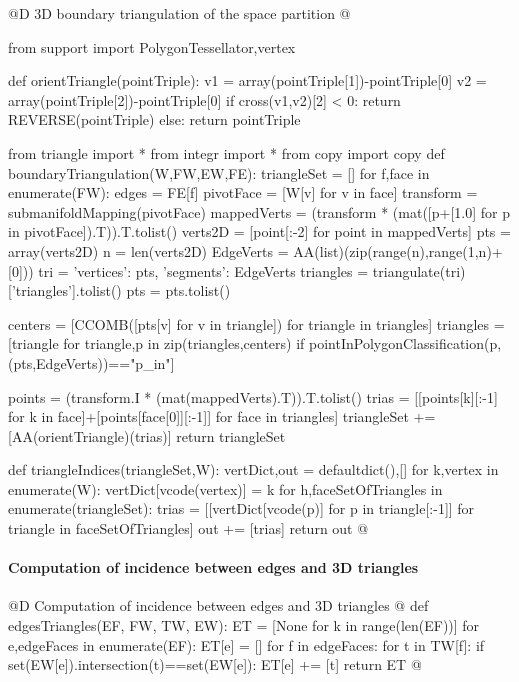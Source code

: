\documentclass[11pt,oneside]{article}    %
\begin{document}
@D 3D boundary triangulation of the space partition 
@{from support import PolygonTessellator,vertex

def orientTriangle(pointTriple):
    v1 = array(pointTriple[1])-pointTriple[0]
    v2 = array(pointTriple[2])-pointTriple[0]
    if cross(v1,v2)[2] < 0: return REVERSE(pointTriple)
    else: return pointTriple
    
from triangle import *
from integr import *
from copy import copy
def boundaryTriangulation(W,FW,EW,FE):
    triangleSet = []    
    for f,face in enumerate(FW):
        edges = FE[f]
        pivotFace = [W[v] for v in face]
        transform = submanifoldMapping(pivotFace)
        mappedVerts = (transform * (mat([p+[1.0] for p in pivotFace]).T)).T.tolist()
        verts2D = [point[:-2] for point in mappedVerts]  
        pts = array(verts2D)
        n = len(verts2D)
        EdgeVerts = AA(list)(zip(range(n),range(1,n)+[0]))
        tri = {    'vertices': pts, 'segments': EdgeVerts }
        triangles = triangulate(tri)['triangles'].tolist()
        pts = pts.tolist()
        
        centers = [CCOMB([pts[v] for v in triangle]) for triangle in triangles]
        triangles = [triangle for triangle,p in zip(triangles,centers) 
        	if pointInPolygonClassification(p,(pts,EdgeVerts))=="p_in"]	

        points = (transform.I * (mat(mappedVerts).T)).T.tolist()
        trias = [[points[k][:-1] for k in face]+[points[face[0]][:-1]] for face in triangles]
        triangleSet += [AA(orientTriangle)(trias)]
    return triangleSet

def triangleIndices(triangleSet,W):
    vertDict,out = defaultdict(),[]
    for k,vertex in enumerate(W):  vertDict[vcode(vertex)] = k
    for h,faceSetOfTriangles in enumerate(triangleSet):
        trias = [[vertDict[vcode(p)] for p in triangle[:-1]] 
                    for triangle in faceSetOfTriangles]
        out += [trias]
    return out
@}


\paragraph{Computation of incidence between edges and 3D triangles}
@D Computation of incidence between edges and 3D triangles @{
def edgesTriangles(EF, FW, TW, EW):
    ET = [None for k in range(len(EF))]
    for e,edgeFaces in enumerate(EF):
        ET[e] = []
        for f in edgeFaces:
            for t in TW[f]:
                if set(EW[e]).intersection(t)==set(EW[e]):
                    ET[e] += [t]
    return ET
@}
\end{document}
